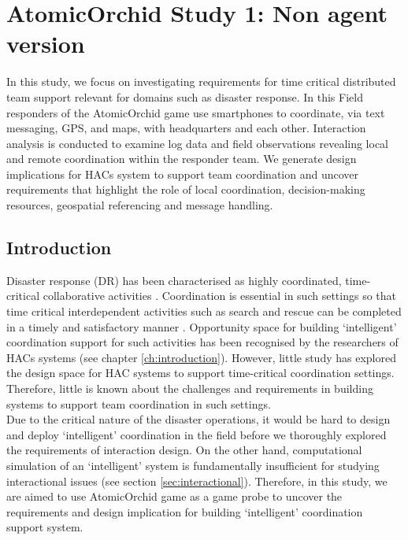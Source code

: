 \chapter{AtomicOrchid Study 1: Non agent version}\label{ch:studyone} %
In this study, we focus on investigating requirements for time critical distributed team support relevant for domains such as disaster response. In this Field responders of the AtomicOrchid game use smartphones to coordinate, via text messaging, GPS, and maps, with headquarters and each other. Interaction analysis is conducted to examine log data and field observations revealing local and remote coordination within the responder team. We generate design implications for HACs system to support team coordination and uncover requirements that highlight the role of local coordination, decision-making resources, geospatial referencing and message handling. \\


\section{Introduction}
Disaster response (DR) has been characterised as highly coordinated, time-critical collaborative activities  \cite{Mendonca2007}. Coordination is essential in such settings so that time critical interdependent activities such as search and rescue can be completed in a timely and satisfactory manner \cite{Bradshaw2011}. Opportunity space for building `intelligent' coordination support for  such activities has been recognised by the researchers of HACs systems (see chapter \ref{ch:introduction}). However, little study has explored the  design space for HAC systems to support time-critical coordination settings. Therefore, little is known about the challenges and requirements in building systems to support team coordination in such settings.\\

Due to the critical nature of the disaster operations, it would be hard to design and deploy `intelligent' coordination in the field before we thoroughly explored the requirements of interaction design. On the other hand, computational simulation of an `intelligent' system is fundamentally insufficient for studying interactional issues (see section \ref{sec:interactional}). Therefore, in this study, we are aimed to use AtomicOrchid game as a game probe to uncover the requirements and design implication for building `intelligent' coordination support system. \\

